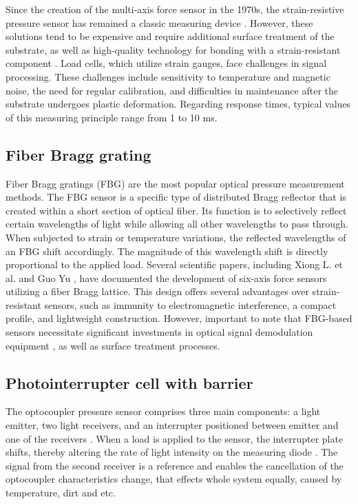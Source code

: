 Since the creation of the multi-axis force sensor in the 1970s, 
the strain-resistive pressure sensor has remained a classic measuring device \cite{3d_FBG_sensor}. 
However, these solutions tend to be expensive and require additional surface treatment of the substrate, 
as well as high-quality technology for bonding with a strain-resistant component 
\cite{my_love_pressure_photosensor, fingertip_based_FBG}. Load cells, which utilize strain gauges, 
face challenges in signal processing. These challenges include sensitivity to temperature and magnetic noise, 
the need for regular calibration, and difficulties in maintenance after the substrate undergoes plastic deformation.
Regarding response times, typical values of this measuring principle range from 1 to 10 ms. \cite{pressure_sens_calibration_stat_dyn}

\subsection{Fiber Bragg grating}
Fiber Bragg gratings (FBG) are the most popular optical pressure measurement methods. The FBG sensor is a specific type 
of distributed Bragg reflector that is created within a short section of optical fiber. 
Its function is to selectively reflect certain wavelengths of light while allowing all other wavelengths to pass through. 
When subjected to strain or temperature variations, the reflected wavelengths of an FBG shift accordingly. 
The magnitude of this wavelength shift is directly proportional to the applied load.
Several scientific papers, including Xiong L. et al. \cite{3d_FBG_sensor} and Guo Yu \cite{fingertip_based_FBG}, 
have documented the development of six-axis force sensors utilizing a fiber Bragg lattice. 
This design offers several advantages over strain-resistant sensors, such as immunity to electromagnetic interference, 
a compact profile, and lightweight construction. However, important to note that FBG-based sensors 
necessitate significant investments in optical signal demodulation equipment \cite{3d_FBG_sensor}, 
as well as surface treatment processes.

\subsection{Photointerrupter cell with barrier}

The optocoupler pressure sensor comprises three main components: a light emitter, two light receivers, and an interrupter positioned between emitter and one of the receivers \cite{my_love_pressure_photosensor}. 
When a load is applied to the sensor, the interrupter plate shifts, thereby altering the rate of light intensity on the measuring diode \cite{1990_optic}.
The signal from the second receiver is a reference and enables the cancellation of the optocoupler characteristics change, that effects whole system equally, caused by temperature, dirt and etc.

